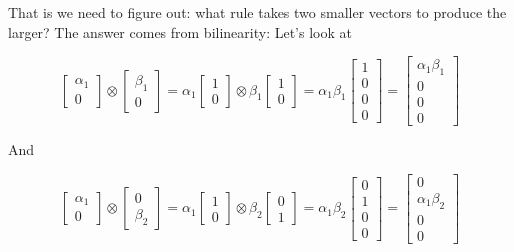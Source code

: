 \documentclass[main.tex]{subfiles}
\begin{document}
    That is we need to figure out: what rule takes two smaller vectors to produce the larger? The answer comes from bilinearity: Let's look at
    
    $$
    \left[\begin{array}{c}
    \alpha_{1} \\
    0
    \end{array}\right] \otimes\left[\begin{array}{c}
    \beta_{1} \\
    0
    \end{array}\right]=\alpha_{1}\left[\begin{array}{l}
    1 \\
    0
    \end{array}\right] \otimes \beta_{1}\left[\begin{array}{l}
    1 \\
    0
    \end{array}\right]=\alpha_{1} \beta_{1}\left[\begin{array}{l}
    1 \\
    0 \\
    0 \\
    0
    \end{array}\right]=\left[\begin{array}{c}
    \alpha_{1} \beta_{1} \\
    0 \\
    0 \\
    0
    \end{array}\right]
    $$
    
    And
    
    $$
    \left[\begin{array}{c}
    \alpha_{1} \\
    0
    \end{array}\right] \otimes\left[\begin{array}{c}
    0 \\
    \beta_{2}
    \end{array}\right]=\alpha_{1}\left[\begin{array}{l}
    1 \\
    0
    \end{array}\right] \otimes \beta_{2}\left[\begin{array}{l}
    0 \\
    1
    \end{array}\right]=\alpha_{1} \beta_{2}\left[\begin{array}{l}
    0 \\
    1 \\
    0 \\
    0
    \end{array}\right]=\left[\begin{array}{c}
    0 \\
    \alpha_{1} \beta_{2} \\
    0 \\
    0
    \end{array}\right]
    $$
    
\end{document}
